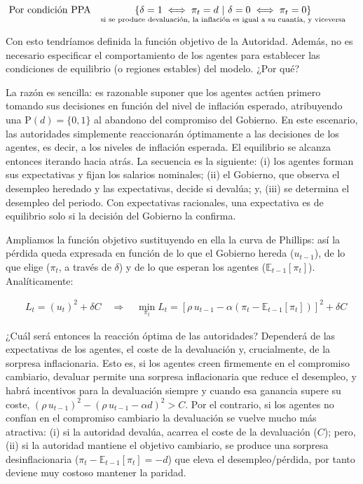 \documentclass[10pt,a4paper]{article}
\begin{document}
$$\begin{aligned}
  &\text{Por condición PPA}&& \text{$\underset{\text{\scriptsize si se produce devaluación, la inflación es igual a su cuantía, y viceversa}}{\{\delta=1\iff \pi_t=d\,\,|\,\,\delta =0\iff \pi_t=0\}}$}
\end{aligned}$$

Con esto tendríamos definida la función objetivo de la Autoridad. Además, no es necesario especificar el comportamiento de los agentes para establecer las condiciones de equilibrio (o regiones estables) del modelo. ¿Por qué?

La razón es sencilla: es razonable suponer que los agentes actúen primero tomando sus decisiones en función del nivel de inflación esperado, atribuyendo una $\mathrm P(d)=\{0,1\}$ al abandono del compromiso del Gobierno. En este escenario, las autoridades simplemente reaccionarán óptimamente a las decisiones de los agentes, es decir, a los niveles de inflación esperada. El equilibrio se alcanza entonces iterando hacia atrás. La secuencia es la siguiente: (i) los agentes forman sus expectativas y fijan los salarios nominales; (ii) el Gobierno, que observa el desempleo heredado y las expectativas, decide si devalúa; y, (iii) se determina el desempleo del periodo. Con expectativas racionales, una expectativa es de equilibrio solo si la decisión del Gobierno la confirma.

Ampliamos la función objetivo sustituyendo en ella la curva de Phillips: así la pérdida queda expresada en función de lo que el Gobierno hereda ($u_{t-1}$), de lo que elige ($\pi_t$, a través de $\delta$) y de lo que esperan los agentes ($\mathbb E_{t-1}[\pi_t]$). Analíticamente:

$$\begin{aligned}
  &L_t=(u_t)^2+\delta C\quad\Longrightarrow\quad \boxed{\min_{\pi_t} L_t=[\rho\,u_{t-1}-\alpha(\pi_t-\mathbb E_{t-1}[\pi_t])]^2+\delta C}
\end{aligned}$$

¿Cuál será entonces la reacción óptima de las autoridades? Dependerá de las expectativas de los agentes, el coste de la devaluación y, crucialmente, de la sorpresa inflacionaria. Esto es, si los agentes creen firmemente en el compromiso cambiario, devaluar permite una sorpresa inflacionaria que reduce el desempleo, y habrá incentivos para la devaluación siempre y cuando esa ganancia supere su coste, $(\rho\,u_{t-1})^2-(\rho\,u_{t-1}-\alpha d)^2>C$. Por el contrario, si los agentes no confían en el compromiso cambiario la devaluación se vuelve mucho más atractiva: (i) si la autoridad devalúa, acarrea el coste de la devaluación ($C$); pero, (ii) si la autoridad mantiene el objetivo cambiario, se produce una sorpresa desinflacionaria ($\pi_t-\mathbb E_{t-1}[\pi_t]=-d$) que eleva el desempleo/pérdida, por tanto deviene muy costoso mantener la paridad.
\end{document}
